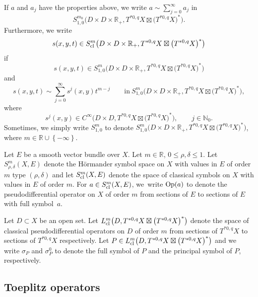 \documentclass[pdftex]{sigma}
\numberwithin{equation}{section}
\newcommand{\Real}{\mathbb R}
\newcommand{\N}{\mathbb N}
\newcommand{\set}[1]{\left\{#1\right\}}
\begin{document}
\begin{Definition}
	 	If $a$ and $a_j$ have the properties above, we write $a\sim\sum^{\infty}_{j=0}a_j$ in
	 	\[S^{m_0}_{1,0}\bigl(D\times D\times\mathbb{R}_+,T^{*0,q}X\boxtimes\bigl(T^{*0,q}X\bigr)^*\bigr) .\]
	 	Furthermore, we write
	 	\[
	 	s(x, y, t)\in S^{m}_{{\rm cl }}\bigl(D\times D\times\mathbb{R}_+,T^{*0,q}X\boxtimes\bigl(T^{*0,q}X\bigr)^*\bigr)
	 	\]
	 	if \[s(x, y, t)\in S^{m}_{1,0}\bigl(D\times D\times\mathbb{R}_+,T^{*0,q}X\boxtimes\bigl(T^{*0,q}X\bigr)^*\bigr)\] and
	 	\[
	 		s(x, y, t)\sim\sum^\infty_{j=0}s^j(x, y)t^{m-j}\qquad \text{in} \ S^{m}_{1, 0}
	 		\bigl(D\times D\times\mathbb{R}_+ ,T^{*0,q}X\boxtimes\bigl(T^{*0,q}X\bigr)^*\bigr) ,
	 	\]
	 	where
	 	\[
	 		s^j(x, y)\in{C}^\infty\bigl(D\times D,T^{*0,q}X\boxtimes\bigl(T^{*0,q}X\bigr)^*\bigr),\qquad j\in\N_0 .
	 	\]
	 	Sometimes, we simply write $S^{m}_{1,0}$ to denote
$
S^m_{1,0}\bigl(D\times D\times\mathbb{R}_+,T^{*0,q}X\boxtimes\bigl(T^{*0,q}X\bigr)^*\bigr)$,
 where $m\in\mathbb R\cup\set{-\infty}$.
	 \end{Definition}
	
	 Let $E$ be a smooth
	 vector bundle over $X$. Let $m\in\Real$, $0\leq\rho,\delta\leq1$. Let $S^m_{\rho,\delta}(X,E)$
	 denote the H\"{o}rmander symbol space on $X$ with values in $E$ of order $m$ type $(\rho,\delta)$
	 and let $S^m_{{\rm cl }}(X,E)$
	 denote the space of classical symbols on $X$ with values in $E$ of order $m$.
	 For $a\in S^m_{{\rm cl }}(X,E)$, we~write ${\rm Op }(a)$ to denote the pseudodifferential operator on $X$ of order $m$ from sections of $E$ to sections of $E$ with full symbol~$a$.
	
	 Let $D\subset X$ be an open set. Let
$L^m_{{\rm cl }}\bigl(D,T^{*0,q}X\boxtimes \bigl(T^{*0,q}X\bigr)^*\bigr)$
	 denote the space of classical
	 pseudodifferential operators on $D$ of order $m$ from sections of
	 $T^{*0,q}X$ to sections of $T^{*0,q}X$ respectively. Let $P\in L^m_{{\rm cl }}\bigl(D,T^{*0,q}X\boxtimes \bigl(T^{*0,q}X\bigr)^*\bigr) $ and we write $\sigma_P$ and $\sigma^0_P$ to denote the full symbol of $P$ and the principal symbol of $P$, respectively.
 	
 	 \subsection{Toeplitz operators}
	 \label{sec:toep}
	
\end{document}
